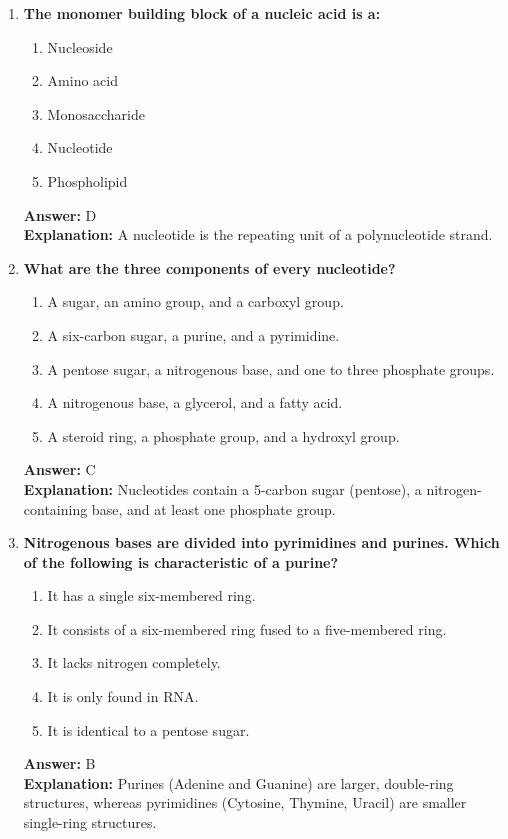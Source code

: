 \documentclass[11pt, a4paper]{article}
\begin{document}
\begin{enumerate}
\item \textbf{The monomer building block of a nucleic acid is a:}
\begin{enumerate}[label=\Alph*.]
    \item Nucleoside
    \item Amino acid
    \item Monosaccharide
    \item Nucleotide
    \item Phospholipid
\end{enumerate}
\textbf{Answer:} D \\
\textbf{Explanation:} A nucleotide is the repeating unit of a polynucleotide strand.

\item \textbf{What are the three components of every nucleotide?}
\begin{enumerate}[label=\Alph*.]
    \item A sugar, an amino group, and a carboxyl group.
    \item A six-carbon sugar, a purine, and a pyrimidine.
    \item A pentose sugar, a nitrogenous base, and one to three phosphate groups.
    \item A nitrogenous base, a glycerol, and a fatty acid.
    \item A steroid ring, a phosphate group, and a hydroxyl group.
\end{enumerate}
\textbf{Answer:} C \\
\textbf{Explanation:} Nucleotides contain a 5-carbon sugar (pentose), a nitrogen-containing base, and at least one phosphate group.

\item \textbf{Nitrogenous bases are divided into pyrimidines and purines. Which of the following is characteristic of a purine?}
\begin{enumerate}[label=\Alph*.]
    \item It has a single six-membered ring.
    \item It consists of a six-membered ring fused to a five-membered ring.
    \item It lacks nitrogen completely.
    \item It is only found in RNA.
    \item It is identical to a pentose sugar.
\end{enumerate}
\textbf{Answer:} B \\
\textbf{Explanation:} Purines (Adenine and Guanine) are larger, double-ring structures, whereas pyrimidines (Cytosine, Thymine, Uracil) are smaller single-ring structures.


\end{enumerate}
\end{document}
